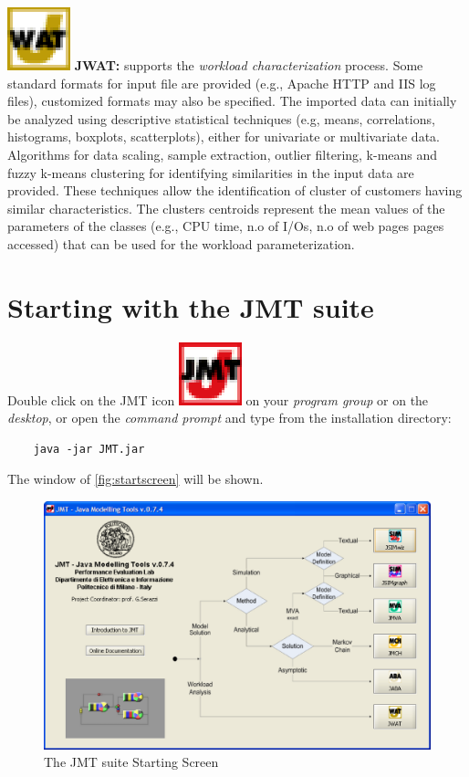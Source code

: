\medskip \noindent \includegraphics[scale=.5]{img/JWATIcon}
\textbf{JWAT:} supports the \emph{workload characterization}
process. Some standard formats for input file are provided (e.g.,
Apache HTTP and IIS log files), customized formats may also be
specified. The imported data can initially be analyzed using
descriptive statistical techniques (e.g, means, correlations,
histograms, boxplots, scatterplots), either for univariate or
multivariate data. Algorithms for data scaling, sample extraction,
outlier filtering, k-means and fuzzy k-means clustering for
identifying similarities in the input data are provided. These
techniques allow the identification of cluster of customers having
similar characteristics. The clusters centroids represent the mean
values of the parameters of the classes (e.g., CPU time, n.o of
I/Os, n.o of web pages pages accessed) that can be used for the
workload parameterization. 

\section{Starting with the JMT suite}
Double click on the JMT icon
\includegraphics[scale=.5]{img/JMTIcon} on your \emph{program group} or
on the \emph{desktop}, or open the \emph{command prompt} and type
from the installation directory:
\begin{verbatim}
    java -jar JMT.jar
\end{verbatim}
The window of \autoref{fig:startscreen} will be shown.

\begin{figure}[htbp]
    \begin{center}
        \includegraphics[scale=.5]{img/StartScreen}
    \end{center}
    \caption{The JMT suite Starting Screen}
    \label{fig:startscreen}
\end{figure}

